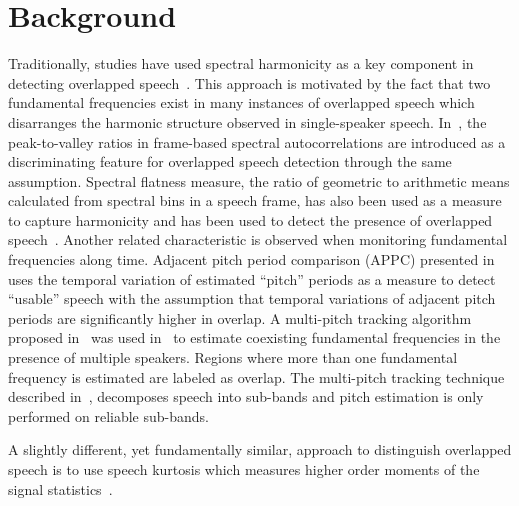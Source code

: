 \section{Background}

Traditionally, studies have used spectral harmonicity as a key component in detecting overlapped speech~\cite{nav_icassp13,smolenski_tut}. 
This approach is motivated by the fact that two fundamental frequencies exist in many instances of overlapped speech which disarranges the harmonic structure observed in single-speaker speech. 
In~\cite{sapvr_2000}, the peak-to-valley ratios in frame-based spectral autocorrelations are introduced as a discriminating feature for overlapped speech detection through the same assumption. 
Spectral flatness measure, the ratio of geometric to arithmetic means calculated from spectral bins in a speech frame, has also been used as a measure to capture harmonicity and has been used to detect the presence of overlapped speech~\cite{nav_icassp13}. 
Another related characteristic is observed when monitoring fundamental frequencies along time. 
Adjacent pitch period comparison (APPC) presented in~\cite{appc2001} uses the temporal variation of estimated ``pitch'' periods as a measure to detect ``usable'' speech with the assumption that temporal variations of adjacent pitch periods are significantly higher in overlap. 
A multi-pitch tracking algorithm proposed in~\cite{Dwang_03_trans} was used in~\cite{Dwang_03} to estimate coexisting fundamental frequencies in the presence of multiple speakers. 
Regions where more than one fundamental frequency is estimated are labeled as overlap. 
The multi-pitch tracking technique described in~\cite{Dwang_03_trans}, decomposes speech into sub-bands and pitch estimation is only performed on reliable sub-bands. 

A slightly different, yet fundamentally similar, approach to distinguish overlapped speech is to use speech kurtosis which measures higher order moments of the signal statistics~\cite{Wrigley_05}. 


